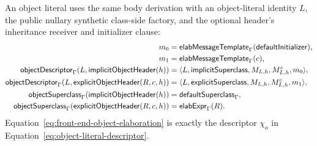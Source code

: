 An object literal uses the same body derivation with an object-literal identity
$L$, the public nullary synthetic class-side factory, and the optional header's
inheritance receiver and initializer clause:
\begin{equation}\label{eq:front-end-object-elaboration}
\begin{aligned}
 m_0&=\mathsf{elabMessageTemplate}_{\Gamma}
         (\mathsf{defaultInitializer}),\\
 m_1&=\mathsf{elabMessageTemplate}_{\Gamma}(c),\\
 \mathsf{objectDescriptor}_{\Gamma}
  (L,\mathsf{implicitObjectHeader}(h))
   &=\langle L,\mathsf{implicitSuperclass},M_{L,h},M^c_{L,h},m_0\rangle,\\
 \mathsf{objectDescriptor}_{\Gamma}
  (L,\mathsf{explicitObjectHeader}(R,c,h))
   &=\langle L,\mathsf{explicitSuperclass},M_{L,h},M^c_{L,h},m_1\rangle,\\
 \mathsf{objectSuperclass}_{\Gamma}(\mathsf{implicitObjectHeader}(h))
   &=\mathsf{defaultSuperclass}_{\Gamma},\\
 \mathsf{objectSuperclass}_{\Gamma}(\mathsf{explicitObjectHeader}(R,c,h))
   &=\mathsf{elabExpr}_{\Gamma}(R).
\end{aligned}
\end{equation}
Equation~\eqref{eq:front-end-object-elaboration} is exactly the descriptor
$\chi_o$ in Equation~\eqref{eq:object-literal-descriptor}.

